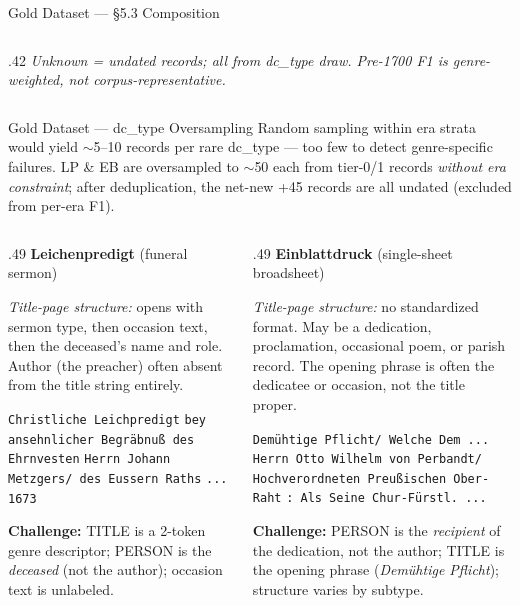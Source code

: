 \documentclass[xcolor,aspectratio=169,compress]{beamer}
\begin{document}
\begin{frame}{Gold Dataset --- \S5.3 Composition}
\begin{columns}[t]
\begin{column}{.42\textwidth}
      \smallskip
      \footnotesize\textit{Unknown = undated records; all from dc\_type draw.
      Pre-1700 F1 is genre-weighted, not corpus-representative.}
    \end{column}
  \end{columns}
\end{frame}

\begin{frame}{Gold Dataset --- dc\_type Oversampling}
  \small
  Random sampling within era strata would yield $\sim$5--10 records per rare dc\_type ---
  too few to detect genre-specific failures.
  LP \& EB are oversampled to $\sim$50 each from tier-0/1 records \textit{without era constraint};
  after deduplication, the net-new +45 records are all undated (excluded from per-era F1).
  \smallskip
  \begin{columns}[t]
    \begin{column}{.49\textwidth}
      \textbf{Leichenpredigt} (funeral sermon)

      \textit{Title-page structure:} opens with sermon type, then occasion text, then the deceased's name and role.
      Author (the preacher) often absent from the title string entirely.
      \smallskip

      \footnotesize
      \colorbox{green!25}{\texttt{Christliche Leichpredigt}}
      \texttt{bey ansehnlicher Begräbnuß des Ehrnvesten}
      \colorbox{blue!20}{\texttt{Herrn Johann Metzgers/ des Eussern Raths}}
      \texttt{... 1673}

      \smallskip\small
      \textbf{Challenge:} TITLE is a 2-token genre descriptor; PERSON is the \textit{deceased} (not the author); occasion text is unlabeled.
    \end{column}
    \begin{column}{.49\textwidth}
      \textbf{Einblattdruck} (single-sheet broadsheet)

      \textit{Title-page structure:} no standardized format. May be a dedication, proclamation, occasional poem, or parish record. The opening phrase is often the dedicatee or occasion, not the title proper.
      \smallskip

      \footnotesize
      \texttt{Demühtige Pflicht/ Welche Dem ...}
      \colorbox{blue!20}{\texttt{Herrn Otto Wilhelm von Perbandt/}}
      \colorbox{blue!20}{\texttt{Hochverordneten Preußischen Ober-Raht}}
      \texttt{: Als Seine Chur-Fürstl. ...}

      \smallskip\small
      \textbf{Challenge:} PERSON is the \textit{recipient} of the dedication, not the author; TITLE is the opening phrase (\textit{Demühtige Pflicht}); structure varies by subtype.
    \end{column}
  \end{columns}
\end{frame}
\end{document}
